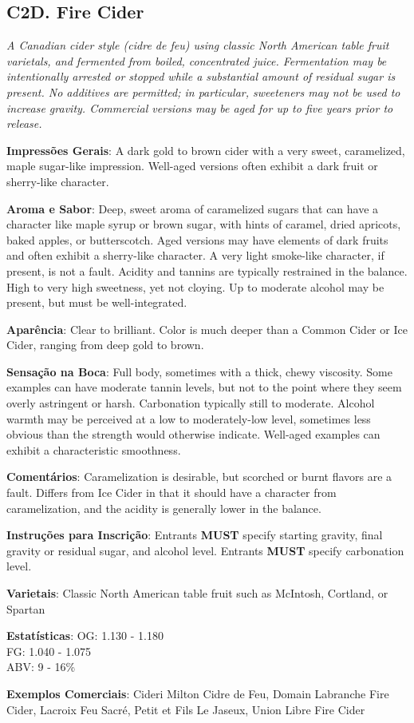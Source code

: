\subsection*{C2D. Fire Cider}

\textit{A Canadian cider style (cidre de feu) using classic North American table fruit varietals, and fermented from boiled, concentrated juice. Fermentation may be intentionally arrested or stopped while a substantial amount of residual sugar is present. No additives are permitted; in particular, sweeteners may not be used to increase gravity. Commercial versions may be aged for up to five years prior to release.}

\textbf{Impressões Gerais}: A dark gold to brown cider with a very sweet, caramelized, maple sugar-like impression. Well-aged versions often exhibit a dark fruit or sherry-like character.

\textbf{Aroma e Sabor}: Deep, sweet aroma of caramelized sugars that can have a character like maple syrup or brown sugar, with hints of caramel, dried apricots, baked apples, or butterscotch. Aged versions may have elements of dark fruits and often exhibit a sherry-like character. A very light smoke-like character, if present, is not a fault. Acidity and tannins are typically restrained in the balance. High to very high sweetness, yet not cloying. Up to moderate alcohol may be present, but must be well-integrated.

\textbf{Aparência}: Clear to brilliant. Color is much deeper than a Common Cider or Ice Cider, ranging from deep gold to brown.

\textbf{Sensação na Boca}: Full body, sometimes with a thick, chewy viscosity. Some examples can have moderate tannin levels, but not to the point where they seem overly astringent or harsh. Carbonation typically still to moderate. Alcohol warmth may be perceived at a low to moderately-low level, sometimes less obvious than the strength would otherwise indicate. Well-aged examples can exhibit a characteristic smoothness.

\textbf{Comentários}: Caramelization is desirable, but scorched or burnt flavors are a fault. Differs from Ice Cider in that it should have a character from caramelization, and the acidity is generally lower in the balance.

\textbf{Instruções para Inscrição}: Entrants \textbf{MUST} specify starting gravity, final gravity or residual sugar, and alcohol level. Entrants \textbf{MUST} specify carbonation level.

\textbf{Varietais}: Classic North American table fruit such as McIntosh, Cortland, or Spartan

\textbf{Estatísticas}: OG: 1.130 - 1.180 \\
\phantom{ } \hspace{16.5mm} FG: 1.040 - 1.075 \\
\phantom{ } \hspace{16.5mm} ABV: 9 - 16\%

\textbf{Exemplos Comerciais}: Cideri Milton Cidre de Feu, Domain Labranche Fire Cider, Lacroix Feu Sacré, Petit et Fils Le Jaseux, Union Libre Fire Cider